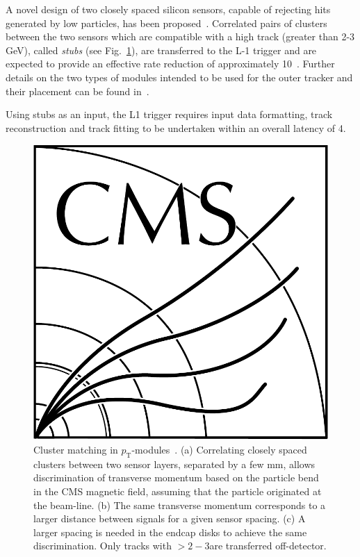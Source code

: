 A novel design of two closely spaced silicon sensors, capable of rejecting hits generated by low \pT particles, has been proposed~\cite{jjonespixel,markthesis}. Correlated pairs of clusters between the two sensors which are compatible with a high \pT track (greater than 2-3 GeV), called \textit{stubs} (see Fig.~\ref{stubs}), are transferred to the L-1 trigger and are expected to provide an effective rate reduction of approximately 10~\cite{mpessimperf,2dptmoduleconcept}. Further details on the two types of \pT modules intended to be used for the outer tracker and their placement can be found in~\cite{CMS_Upgrade_TP,P2TrackerTDR}.

Using stubs as an input, the L1 trigger requires input data formatting, track reconstruction and track fitting to be undertaken within an overall latency of 4\mus.  

\begin{figure}[!h]
\centering
\includegraphics[width=5in]{CMS-bw-logo.pdf}
\caption{Cluster matching in $p_\mathrm{T}$-modules~\cite{P2TrackerTDR}. (a) Correlating closely spaced clusters between two sensor layers, separated by a few mm, allows discrimination of transverse momentum based on the particle bend in the CMS magnetic field, assuming that the particle originated at the beam-line. (b) The same transverse momentum corresponds to a larger distance between signals for a given sensor spacing. (c) A larger spacing is needed in the endcap disks to achieve the same discrimination. Only tracks with \pT $> 2-3$\GeVc are transferred off-detector.
}
\label{stubs}
\end{figure}

